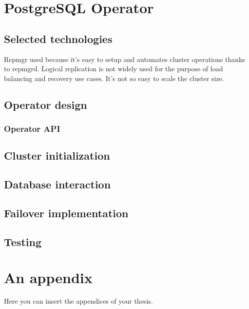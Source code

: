 \documentclass[
  digital, %
  twoside, %
  table,   %
  lof,     %
  lot,     %
]{fithesis3}
\begin{document}
\chapter{PostgreSQL Operator}

\section{Selected technologies}
Repmgr used because it's easy to setup and automates cluster operations thanks to repmgrd. Logical replication is not widely used for the purpose of load balancing and recovery use cases. It's not so easy to scale the cluster size.

\section{Operator design}
\subsection{Operator API}
\section{Cluster initialization}
\section{Database interaction}
\section{Failover implementation}
\section{Testing}

\appendix %
\chapter{An appendix}
Here you can insert the appendices of your thesis.
\end{document}
